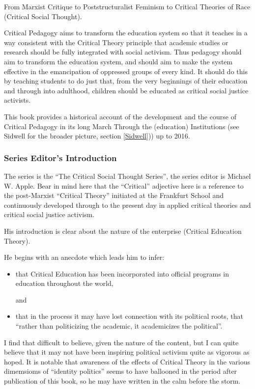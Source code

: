 \documentclass[10pt,titlepage]{book}
\begin{document}
From Marxist Critique to Poststructuralist Feminism to Critical Theories of Race (Critical Social Thought).

Critical Pedagogy aims to transform the education system so that it teaches in a way consistent with the Critical Theory principle that academic studies or research should be fully integrated with social activism.
Thus pedagogy should aim to transform the education system, and should aim to make the system effective in the emancipation of oppressed groups of every kind.
It should do this by teaching students to do just that, from the very beginnings of their education and through into adulthood, children should be educated as critical social justice activists.

This book provides a historical account of the development and the course of Critical Pedagogy in its long March Through the (education) Institutions (see Sidwell for the broader picture, section \ref{Sidwell})) up to 2016.

\subsubsection{Series Editor's Introduction}

The series is the ``The Critical Social Thought Series'', the series editor is Michael W. Apple.
Bear in mind here that the ``Critical'' adjective here is a reference to the post-Marxist ``Critical Theory'' initiated at the Frankfurt School and continuously developed through to the present day in applied critical theories and critical social justice activism.

His introduction is clear about the nature of the enterprise (Critical Education Theory).

He begins with an anecdote which leads him to infer:

\begin{itemize}
\item that Critical Education has been incorporated into official programs in education throughout the world,

  and
\item that in the process it may have lost connection with its political roots, that ``rather than politicizing the academic, it academicizes the political''.
\end{itemize}

I find that difficult to believe, given the nature of the content, but I can quite believe that it may not have been inspiring political activism quite as vigorous as hoped.
It is notable that awareness of the effects of Critical Theory in the various dimemsioms of ``identity politics'' seems to have ballooned in the period after publication of this book, so he may have written in the calm before the storm.
\end{document}
